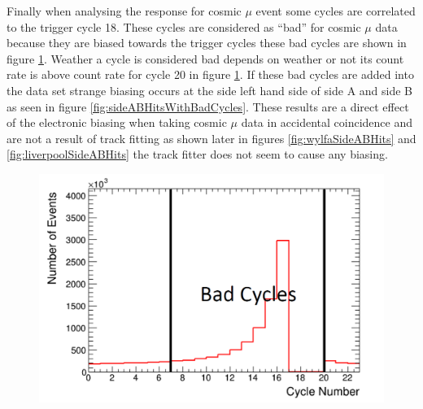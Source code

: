 Finally when analysing the response for cosmic $\mu$ event some cycles are correlated to the trigger cycle 18. These cycles are considered as ``bad'' for cosmic $\mu$ data because they are biased towards the trigger cycles these bad cycles are shown in figure \ref{fig:badCycles}. Weather a cycle is considered bad depends on weather or not its count rate is above count rate for cycle 20 in figure \ref{fig:badCycles}. If these bad cycles are added into the data set strange biasing occurs at the side left hand side of side A and side B as seen in figure \ref{fig:sideABHitsWithBadCycles}. These results are a direct effect of the electronic biasing when taking cosmic $\mu$ data in accidental coincidence and are not a result of track fitting as shown later in figures \ref{fig:wylfaSideABHits} and \ref{fig:liverpoolSideABHits} the track fitter does not seem to cause any biasing. 

\begin{figure}[htbp]
 \centering
 \includegraphics[width=0.7\linewidth]{Chapter5/Figs/Raster/badCycles.png}
 \label{fig:badCycles}
\end{figure}


